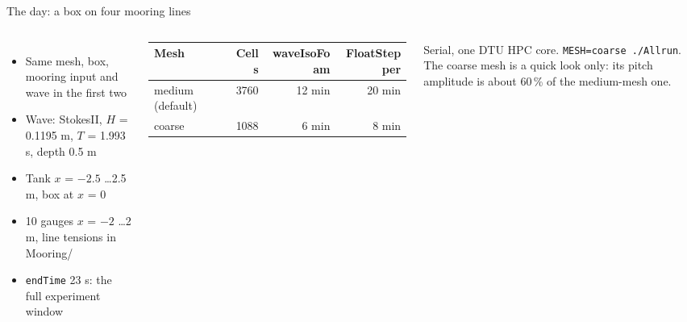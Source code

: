 \documentclass[aspectratio=169,10pt]{beamer}
\newcommand{\file}[1]{{\leavevmode\ttfamily\color{deep}#1}}
\begin{document}
\begin{frame}{The day: a box on four mooring lines}
  \centering

  \vspace{4mm}
  \begin{columns}[T]
    \small
    \begin{itemize}
      \item Same mesh, box, mooring input and wave in the first two
      \item Wave: StokesII, $H$ = 0.1195 m, $T$ = 1.993 s, depth 0.5 m
      \item Tank $x$ = $-2.5$ \dots 2.5 m, box at $x$ = 0
      \item 10 gauges $x$ = $-2$ \dots 2 m, line tensions in \file{Mooring/}
      \item \texttt{endTime} 23 s: the full experiment window
    \end{itemize}
    \footnotesize
    \renewcommand{\arraystretch}{1.15}
    \begin{tabular}{@{}lrrr@{}}
      \toprule
      Mesh & Cells & waveIsoFoam & FloatStepper \\
      \midrule
      medium (default) & 3760 & 12 min & 20 min \\
      coarse & 1088 & 6 min & 8 min \\
      \bottomrule
    \end{tabular}

    \vspace{2mm}
    \scriptsize Serial, one DTU HPC core. \texttt{MESH=coarse ./Allrun}. The coarse mesh is a quick look only: its pitch
    amplitude is about 60\,\% of the medium-mesh one.
  \end{columns}
\end{frame}
\end{document}
